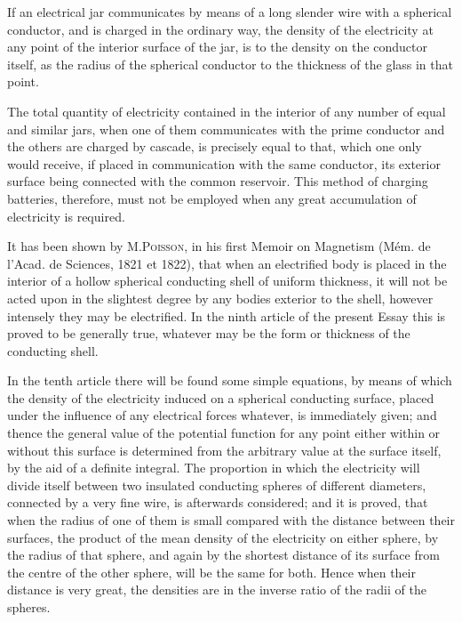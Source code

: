 \documentclass[12pt,notitlepage]{amsart}
\let\Person\textsc
\begin{document}
If an electrical jar communicates by means of a long slender wire
with a spherical conductor, and is charged in the ordinary way, the density
of the electricity at any point of the interior surface of the jar, is to the
density on the conductor itself, as the radius of the spherical conductor to the
thickness of the glass in that point.

The total quantity of electricity contained in the interior of any number
of equal and similar jars, when one of them communicates with the prime
conductor and the others are charged by cascade, is precisely equal to that,
which one only would receive, if placed in communication with the same
conductor, its exterior surface being connected with the common reservoir.
This method of charging batteries, therefore, must not be employed when any
great accumulation of electricity is required.

It has been shown by M.\Person{Poisson}, in his first Memoir on Magnetism
(M\'em. de l'Acad. de Sciences, 1821 et 1822), that when an electrified body
is placed in the interior of a hollow spherical conducting shell of uniform
thickness, it will not be acted upon in the slightest degree by any bodies
exterior to the shell, however intensely they may be electrified. In the ninth
article of the present Essay this is proved to be generally true, whatever may
be the form or thickness of the conducting shell.

In the tenth article there will be found some simple equations, by
means of which the density of the electricity induced on a spherical conducting
surface, placed under the influence of any electrical forces whatever, is 
immediately given; and thence the general value of the potential function for
any point either within or without this surface is determined from the arbitrary
value at the surface itself, by the aid of a definite integral. The proportion
in which the electricity will divide itself between two insulated conducting
spheres of different diameters, connected by a very fine wire, is afterwards
considered; and it is proved, that when the radius of one of them is small
compared with the distance between their surfaces, the product of the mean
density of the electricity on either sphere, by the radius of that sphere, and
again by the shortest distance of its surface
from the centre of the other sphere,
will be the same for both. Hence when their distance is very great, the
densities are in the inverse ratio of the radii of the spheres.
\end{document}
